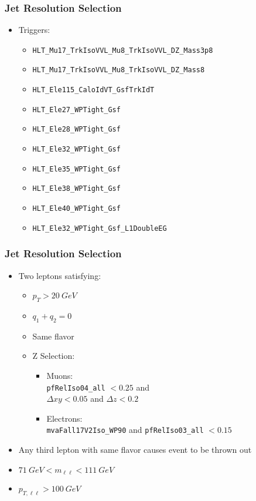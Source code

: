 \documentclass{beamer}
\begin{document}
\begin{frame}
  \frametitle{Jet Resolution Selection}

  \begin{itemize}
  \item Triggers:
    \begin{itemize}
    \item \texttt{HLT\_Mu17\_TrkIsoVVL\_Mu8\_TrkIsoVVL\_DZ\_Mass3p8}
    \item \texttt{HLT\_Mu17\_TrkIsoVVL\_Mu8\_TrkIsoVVL\_DZ\_Mass8}
    \item \texttt{HLT\_Ele115\_CaloIdVT\_GsfTrkIdT}
    \item \texttt{HLT\_Ele27\_WPTight\_Gsf}
    \item \texttt{HLT\_Ele28\_WPTight\_Gsf}
    \item \texttt{HLT\_Ele32\_WPTight\_Gsf}
    \item \texttt{HLT\_Ele35\_WPTight\_Gsf}
    \item \texttt{HLT\_Ele38\_WPTight\_Gsf}
    \item \texttt{HLT\_Ele40\_WPTight\_Gsf}
    \item \texttt{HLT\_Ele32\_WPTight\_Gsf\_L1DoubleEG}
    \end{itemize}
  \end{itemize}

\end{frame}

\begin{frame}
  \frametitle{Jet Resolution Selection}

  \begin{itemize}
  \item Two leptons satisfying:
    \begin{itemize}
    \item $p_T > \SI{20}{GeV}$
    \item $q_1 + q_2 = 0$
    \item Same flavor
    \item Z Selection:
      \begin{itemize}
      \item Muons: \\
        \texttt{pfRelIso04\_all} $< 0.25$ and \\
        $\Delta xy < 0.05$ and $\Delta z < 0.2$
      \item Electrons: \\
        \texttt{mvaFall17V2Iso\_WP90} and \texttt{pfRelIso03\_all} $< 0.15$
      \end{itemize}
    \end{itemize}
  \item Any third lepton with same flavor causes event to be thrown out
  \item $\SI{71}{GeV} < m_{\ell\ell} < \SI{111}{GeV}$
  \item $p_{T,\ell\ell} > \SI{100}{GeV}$
  \end{itemize}

\end{frame}
\end{document}
